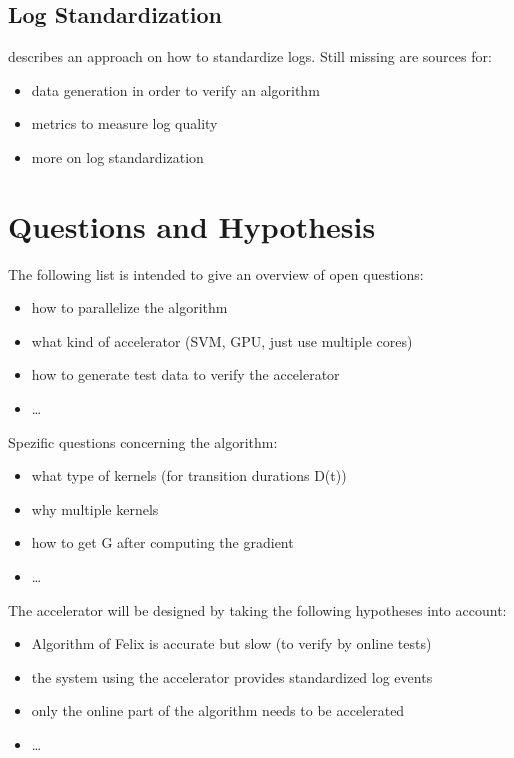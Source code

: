 \documentclass[12pt]{article} %
\begin{document}

\subsection{Log Standardization} %

\cite{IPDPS04_Salfner} describes an approach on how to standardize logs. Still
missing are sources for:
\begin{itemize}
    \item data generation in order to verify an algorithm
    \item metrics to measure log quality
    \item more on log standardization
\end{itemize}


\section{Questions and Hypothesis} %

The following list is intended to give an overview of open questions:
\begin{itemize}
    \item how to parallelize the algorithm
    \item what kind of accelerator (SVM, GPU, just use multiple cores)
    \item how to generate test data to verify the accelerator
    \item \dots
\end{itemize}

Spezific questions concerning the algorithm:
\begin{itemize}
    \item what type of kernels (for transition durations D(t))
    \item why multiple kernels
    \item how to get G after computing the gradient
    \item \dots
\end{itemize}

The accelerator will be designed by taking the following hypotheses into account:
\begin{itemize}
    \item Algorithm of Felix is accurate but slow (to verify by online tests)
    \item the system using the accelerator provides standardized log events
    \item only the online part of the algorithm needs to be accelerated
    \item \dots
\end{itemize}
\end{document}
